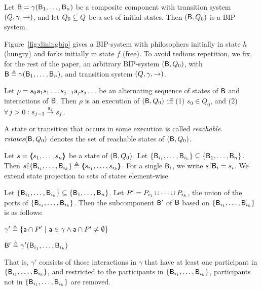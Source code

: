 \begin{definition}\label{def.bip.system} Let $\B = \gamma(\B_1,\dots,\B_n)$ be a composite component with transition system $(Q,\gamma,
\goestog)$, and let $Q_0 \sub Q$ be a set of initial states. Then
$(\B,Q_0)$ is a BIP system.  
\end{definition}

\noindent
Figure~\ref{fig:diningbip} gives a BIP-system with philosophers initially in state $h$ (hungry) and forks initially in
state $f$ (free).
%
To avoid tedious repetition, we fix, for the rest of the paper, an arbitrary BIP-system $(\B, Q_0)$, with
$\B \df \gamma(\B_1,\dots,\B_n)$, and transition system $(Q,\gamma, \goestog)$.

\begin{definition}[Execution]\label{def.bip.execution}
Let $\rho = s_0 \act_1 s_1 \ldots s_{j-1} \act_j s_j \ldots$ be an alternating sequence of
states of $\B$ and interactions of $\B$. Then $\rho$ is an execution of
$(\B, Q_0)$ iff (1) $s_0 \in Q_0$, and (2) $\fa j > 0: s_{j-1} \goesto[\act_j] s_j$. 
\end{definition}

\begin{definition}\label{def.bip.reachable}
A state or transition that occurs in some execution is called \emph{reachable}.
$\rstates{\B,Q_0}$ denotes the set of reachable states of $(\B, Q_0)$.
\end{definition}


\begin{definition}\label{def.bip.state.projection} 
Let $s = \tpl{s_1,\dots,s_n}$ be a state of $(\B, Q_0)$. Let $\set{\B_{i_1},\dots,\B_{i_k}} \sub \set{\B_1,\dots,\B_n}$. Then
$s \pj \set{\B_{i_1},\dots,\B_{i_k}} \df \tpl{s_{i_1},\dots,s_{i_k}}$. For a single $\B_i$, we write $s \pj \B_i = s_i$.
%
We extend state projection to sets of states element-wise.
\end{definition}

\begin{definition}[Subcomponent]\label{def.bip.subcomponent} 
Let $\set{\B_{i_1},\dots,\B_{i_k}} \sub \set{\B_{1},\dots,\B_{n}}$.
Let $P' = P_{i_1} \un \cdots \un P_{i_k}$, \ie the union of the ports of $\set{\B_{i_1},\dots,\B_{i_k}}$.
Then the subcomponent $\B'$ of $\B$ based on $\set{\B_{i_1},\dots,\B_{i_k}}$ is as follows:
%
\bn
\item $\gamma' \df \set{ \act \ints P' \st \act \in \gamma \land \act \ints P' \ne \emptyset}$
\item $\B' \df \gamma'(\B_{i_1},\dots,\B_{i_k})$ 
\en
\end{definition}
%
That is, $\gamma'$ consists of those interactions in $\gamma$ that have at least one participant in 
$\set{\B_{i_1},\dots,\B_{i_k}}$, and restricted to the participants in $\set{\B_{i_1},\dots,\B_{i_k}}$,
\ie participants not in $\set{\B_{i_1},\dots,\B_{i_k}}$ are removed.


